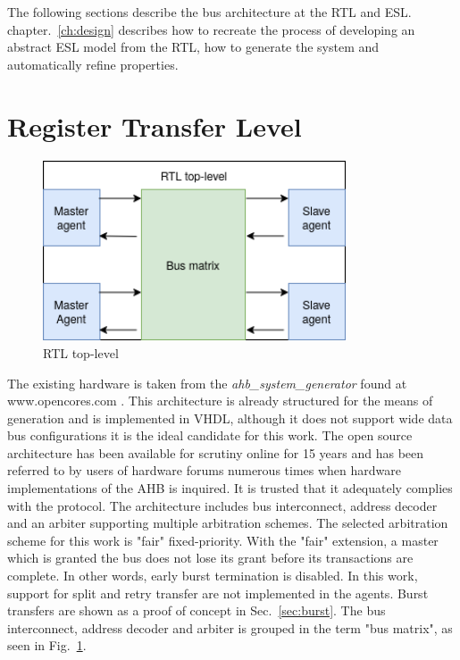 The following sections describe the bus architecture at the RTL and ESL. chapter.~\ref{ch:design} describes how to recreate the process of developing an abstract ESL model from the RTL, how to generate the system and automatically refine properties.  
\newpage

\section{Register Transfer Level}
\begin{figure}[hbt]
    \begin{center}
        \includegraphics[width=0.8\textwidth]{figs/hw/RTL_top.png}
    \end{center}
    \caption{RTL top-level}
    \label{fig:rtl-top}
\end{figure}


The existing hardware is taken from the \textit{ahb\_system\_generator} found at \\
 www.opencores.com \cite{ahbsys}. This architecture is already structured for the means of generation and is implemented in VHDL, although it does not support wide data bus configurations it is the ideal candidate for this work. The open source architecture has been available for scrutiny online for 15 years and has been referred to by users of hardware forums numerous times when hardware implementations of the AHB is inquired. It is trusted that it adequately complies with the protocol. The architecture includes bus interconnect, address decoder and an arbiter supporting multiple arbitration schemes. The selected arbitration scheme for this work is "fair" fixed-priority. With the "fair" extension, a master which is granted the bus does not lose its grant before its transactions are complete. In other words, early burst termination is disabled. In this work, support for split and retry transfer are not implemented in the agents. Burst transfers are shown as a proof of concept in Sec.~\ref{sec:burst}. The bus interconnect, address decoder and arbiter is grouped in the term "bus matrix", as seen in Fig.~\ref{fig:rtl-top}.\par   

